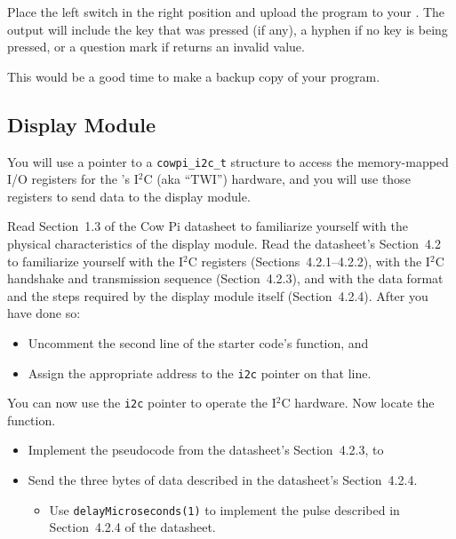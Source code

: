 Place the left switch in the right position and upload the program to your \developmentboard.
The output will include the key that was pressed (if any), a hyphen if no key is being pressed, or a question mark if  returns an invalid value.

\vspace{1cm}

This would be a good time to make a backup copy of your program.


\subsection{Display Module} \label{subsec:DisplayModule}

You will use a pointer to a \lstinline{cowpi_i2c_t} structure to access the memory-mapped I/O registers for the \developmentboard's I$^2$C (aka ``TWI'') hardware,
and you will use those registers to send data to the display module.

Read Section~1.3 of the Cow Pi datasheet to familiarize yourself with the physical characteristics of the display module.
Read the datasheet's Section~4.2 to familiarize yourself with the I$^2$C registers (Sections~4.2.1--4.2.2), with the I$^2$C handshake and transmission sequence (Section~4.2.3), and with the data format and the steps required by the display module itself (Section~4.2.4). After you have done so:

\begin{itemize}
    \item Uncomment the second line of the starter code's  function, and
    \item Assign the appropriate address to the \lstinline{i2c} pointer on that line.
\end{itemize}

You can now use the \lstinline{i2c} pointer to operate the I$^2$C hardware.
Now locate the  function.

\begin{itemize}
    \item Implement the pseudocode from the datasheet's Section~4.2.3, to
    \item Send the three bytes of data described in the datasheet's Section~4.2.4.
        \begin{itemize}
            \item Use \lstinline{delayMicroseconds(1)} to implement the pulse described in Section~4.2.4 of the datasheet.
        \end{itemize}
\end{itemize}

